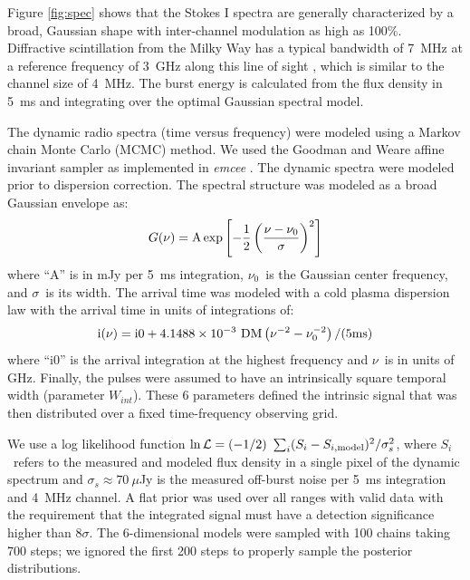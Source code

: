 \documentclass[twocolumn]{aastex61}
\begin{document}
Figure \ref{fig:spec} shows that the Stokes I spectra are generally characterized by a broad, Gaussian shape with inter-channel modulation as high as 100\%. Diffractive scintillation from the Milky Way has a typical bandwidth of 7~MHz at a reference frequency of 3~GHz along this line of sight \citep{2002astro.ph..7156C}, which is similar to the channel size of 4~MHz. The burst energy is calculated from the flux density in 5~ms and integrating over the optimal Gaussian spectral model.

The dynamic radio spectra (time versus frequency) were modeled using a Markov chain Monte Carlo (MCMC) method. We used the Goodman and Weare affine invariant sampler \citep{goodman2010ensemble} as implemented in \emph{emcee} \citep{2013PASP..125..306F}. The dynamic spectra were modeled prior to dispersion correction. The spectral structure was modeled as a broad Gaussian envelope as:
\begin{equation}
G(\nu) = \rm{A} \exp{\left[-\frac{1}{2} \left(\frac{\nu - \nu_0}{\sigma}\right)^2\right]}
\end{equation}
\noindent where ``A'' is in mJy per 5~ms integration, $\nu_0$\ is the Gaussian center frequency, and $\sigma$\ is its width. The arrival time was modeled with a cold plasma dispersion law with the arrival time in units of integrations of:
\begin{equation}
\rm{i} (\nu) = \rm{i0} + 4.1488\times10^{-3}\ \rm{DM} \left(\nu^{-2} - \nu_0^{-2}\right)/(5 \rm{ms})
\end{equation}
\noindent where ``i0'' is the arrival integration at the highest frequency and $\nu$\ is in units of GHz. Finally, the pulses were assumed to have an intrinsically square temporal width (parameter $W_{int}$). These 6 parameters defined the intrinsic signal that was then distributed over a fixed time-frequency observing grid.

We use a log likelihood function $\ln \mathcal{L}=(-1/2)\ \sum_i (S_i - S_{i, \rm{model}})^2/\sigma_s^2$, where $S_i$\ refers to the measured and modeled flux density in a single pixel of the dynamic spectrum and $\sigma_s\approx 70~\mu$Jy is the measured off-burst noise per 5~ms integration and 4~MHz channel. A flat prior was used over all ranges with valid data with the requirement that the integrated signal must have a detection significance higher than 8$\sigma$. The 6-dimensional models were sampled with 100 chains taking 700 steps; we ignored the first 200 steps to properly sample the posterior distributions. 
\end{document}
